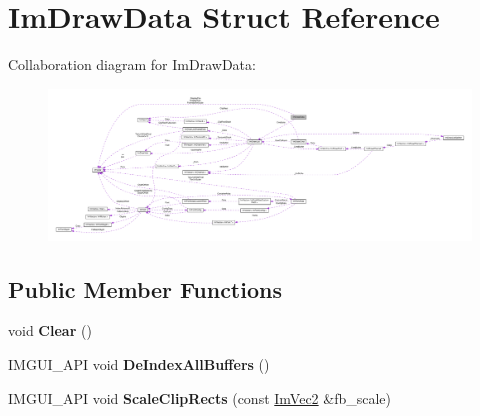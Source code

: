 \hypertarget{structImDrawData}{}\section{Im\+Draw\+Data Struct Reference}
\label{structImDrawData}


Collaboration diagram for Im\+Draw\+Data\+:\nopagebreak
\begin{figure}[H]
\begin{center}
\leavevmode
\includegraphics[width=350pt]{structImDrawData__coll__graph}
\end{center}
\end{figure}
\subsection*{Public Member Functions}
\begin{DoxyCompactItemize}
\item 
\mbox{\label{structImDrawData_ab6a90612bd22eaff0d42539875e2e5c9}} 
void {\bfseries Clear} ()
\item 
\mbox{\label{structImDrawData_a88ae746e958b79ee527fe94dee29d57c}} 
I\+M\+G\+U\+I\+\_\+\+A\+PI void {\bfseries De\+Index\+All\+Buffers} ()
\item 
\mbox{\label{structImDrawData_a951fbe824674c7a5c2f6a478f3654ca8}} 
I\+M\+G\+U\+I\+\_\+\+A\+PI void {\bfseries Scale\+Clip\+Rects} (const \hyperlink{structImVec2}{Im\+Vec2} \&fb\+\_\+scale)
\end{DoxyCompactItemize}
